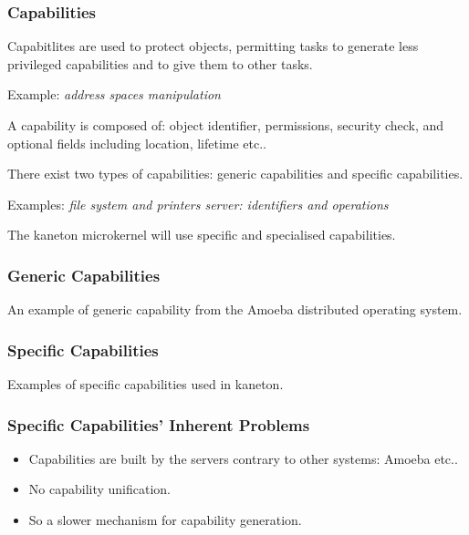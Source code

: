 {%

\begin{frame}
  \frametitle{Capabilities}

  Capabitlites are used to protect objects, permitting tasks to generate
  less privileged capabilities and to give them to other tasks.

  \nl

  Example: \textit{address spaces manipulation}

  \nl

  A capability is composed of: object identifier, permissions,
  security check, and optional fields including location, lifetime
  etc..

  \nl

  There exist two types of capabilities: generic capabilities and
  \alert{specific} capabilities.

  \nl

  Examples: \textit{file system and printers server: identifiers
    and operations}

  \nl

  The kaneton microkernel will use specific and specialised capabilities.
\end{frame}


\begin{frame}
  \frametitle{Generic Capabilities}

  An example of generic capability from the Amoeba distributed operating
  system.

  \nl

  \begin{center}
  \end{center}
\end{frame}


\begin{frame}
  \frametitle{Specific Capabilities}

  Examples of specific capabilities used in kaneton.

  \begin{center}
  \end{center}
\end{frame}


\begin{frame}
  \frametitle{Specific Capabilities' Inherent Problems}

  \begin{itemize}[<+->]
    \item
      Capabilities are built by the servers contrary to other systems:
      Amoeba etc..
    \item
      No capability unification.
    \item
      So a slower mechanism for capability generation.
  \end{itemize}
\end{frame}

}
